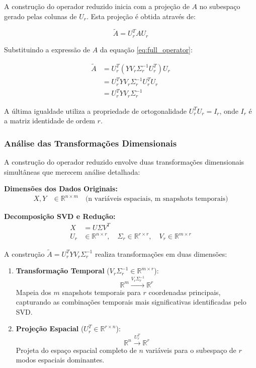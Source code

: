 \documentclass[a4,11pt]{pssbmac}
\begin{document}
A construção do operador reduzido inicia com a projeção de $A$ no subespaço gerado pelas colunas de $U_r$. Esta projeção é obtida através de:

\begin{equation}
\tilde{A} = U_r^T A U_r \label{eq:projection_derivation}
\end{equation}

Substituindo a expressão de $A$ da equação \eqref{eq:full_operator}:

\begin{align}
\tilde{A} &= U_r^T (YV_r\Sigma_r^{-1}U_r^T) U_r\\
&= U_r^T Y V_r \Sigma_r^{-1} U_r^T U_r\\
&= U_r^T Y V_r \Sigma_r^{-1} \label{eq:dmd_operator_derivation}
\end{align}

A última igualdade utiliza a propriedade de ortogonalidade $U_r^T U_r = I_r$, onde $I_r$ é a matriz identidade de ordem $r$.

\subsubsection{Análise das Transformações Dimensionais}

A construção do operador reduzido envolve duas transformações dimensionais simultâneas que merecem análise detalhada:

\textbf{Dimensões dos Dados Originais:}
\begin{align}
X, Y &\in \mathbb{R}^{n \times m} \quad \text{(n variáveis espaciais, m snapshots temporais)}
\end{align}

\textbf{Decomposição SVD e Redução:}
\begin{align}
X &= U\Sigma V^T\\
U_r &\in \mathbb{R}^{n \times r}, \quad \Sigma_r \in \mathbb{R}^{r \times r}, \quad V_r \in \mathbb{R}^{m \times r}
\end{align}

A construção $\tilde{A} = U_r^T Y V_r \Sigma_r^{-1}$ realiza transformações em duas dimensões:

\begin{enumerate}
\item \textbf{Transformação Temporal} ($V_r\Sigma_r^{-1} \in \mathbb{R}^{m \times r}$):
\begin{equation}
\mathbb{R}^m \xrightarrow{V_r\Sigma_r^{-1}} \mathbb{R}^r
\end{equation}
Mapeia dos $m$ snapshots temporais para $r$ coordenadas principais, capturando as combinações temporais mais significativas identificadas pelo SVD.

\item \textbf{Projeção Espacial} ($U_r^T \in \mathbb{R}^{r \times n}$):
\begin{equation}
\mathbb{R}^n \xrightarrow{U_r^T} \mathbb{R}^r
\end{equation}
Projeta do espaço espacial completo de $n$ variáveis para o subespaço de $r$ modos espaciais dominantes.
\end{enumerate}
\end{document}
